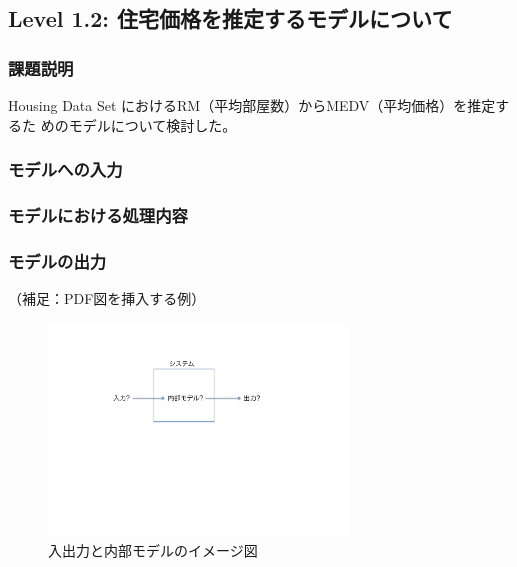 \subsection{Level 1.2: 住宅価格を推定するモデルについて}
\subsubsection{課題説明}
Housing Data Set\cite{housingdata}
におけるRM（平均部屋数）からMEDV（平均価格）を推定するた
めのモデルについて検討した。

\subsubsection{モデルへの入力}
\subsubsection{モデルにおける処理内容}
\subsubsection{モデルの出力}


（補足：PDF図を挿入する例）

\begin{figure}[h]
 \begin{center}
  \includegraphics[width=8.0cm]{figs/system-image.pdf}
  \caption{入出力と内部モデルのイメージ図}
 \end{center}
\end{figure}

